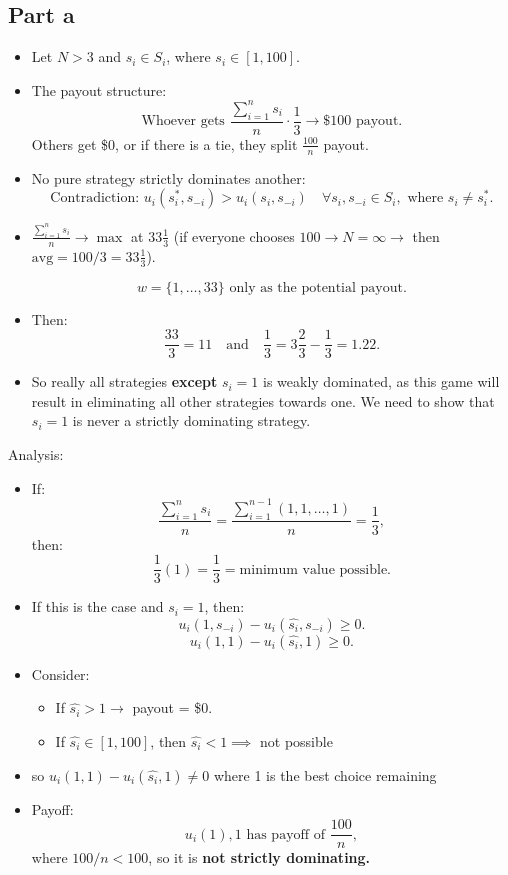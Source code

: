 \documentclass{article}
\begin{document}
\subsection{Part a}
\begin{itemize}
    \item Let $N > 3$ and $s_i \in S_i$, where $s_i \in [1, 100]$. 
    
    \item The payout structure:
    \[
    \text{Whoever gets } \frac{\sum_{i=1}^n s_i}{n}\cdot \frac{1}{3} \rightarrow \text{\$100 payout.}
    \]
    Others get \$0, or if there is a tie, they split $\frac{100}{n}$ payout.

    \item No pure strategy strictly dominates another:
    \[
    \text{Contradiction: } u_i(s_i^*, s_{-i}) > u_i(s_i, s_{-i}) \quad \forall s_i, s_{-i} \in S_i, \text{ where } s_i \neq s_i^*.
    \]
    
    \item $\frac{\sum_{i=1}^n s_i}{n} \to \max$ at $33 \frac{1}{3}$ (if everyone chooses $100 \to N = \infty \to$ then $\text{avg} = 100/3 = 33 \frac{1}{3}$).

    \[
    w = \{1, \dots, 33\} \text{ only as the potential payout}.
    \]

    \item Then:
    \[
    \frac{33}{3} = 11 \quad \text{and} \quad \frac{1}{3} = 3 \frac{2}{3} - \frac{1}{3} = 1.22.
    \]
    
    \item So really all strategies \textbf{except} $s_i = 1$ is weakly dominated, as this game will result in eliminating all other strategies towards one. We need to show that $s_i = 1$ is never a strictly dominating strategy.
\end{itemize}

Analysis: 

\begin{itemize}
    \item If:
    \[
    \frac{\sum_{i=1}^n s_i}{n} = \frac{\sum_{i=1}^{n-1} (1, 1, \dots, 1)}{n} = \frac{1}{3},
    \]
    then:
    \[
    \frac{1}{3}(1) = \frac{1}{3} = \text{minimum value possible.}
    \]

    \item If this is the case and $s_i = 1$, then:
    \[
    u_i(1, s_{-i}) - u_i(\hat{s_i}, s_{-i}) \geq 0.
    \]
    \[
    u_i(1, 1) - u_i(\hat{s_i}, 1) \geq 0.
    \]

    \item Consider:
    \begin{itemize}
        \item If $\hat{s_i} > 1 \to$ payout = \$0.
        \item If $\hat{s_i} \in [1, 100]$, then $\hat{s_i} < 1 \implies$ not possible    \end{itemize}
        \item so $u_i(1,1) - u_i(\hat{s_i}, 1) \neq 0$ where 1 is the best choice remaining 
        \item Payoff:
        \[
        u_i(1),1 \text{ has payoff of } \frac{100}{n},
        \]
        where $100/n < 100$, so it is \textbf{not strictly dominating.}
\end{itemize}
\end{document}
